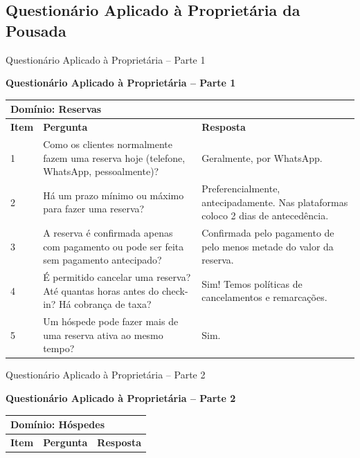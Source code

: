 \documentclass[
	12pt,				%
	openany,			%
	oneside,			%
	a4paper,			%
	english,			%
	french,				%
	spanish,			%
	brazil				%
	]{abntex2}
\begin{document}
\begin{apendicesenv}
\chapter{Questionário Aplicado à Proprietária da Pousada}
\label{apendice:questionario}
\begin{quadro}[H]
	\caption{Questionário Aplicado à Proprietária – Parte 1}
	\label{quadro:questionario1}
	\vspace{0.3cm} 
	\textbf\bfseries\large{Questionário Aplicado à Proprietária – Parte 1} \\
	\vspace{0.3cm} 
	\begin{tabular}{|p{1cm}|p{6.5cm}|p{6.5cm}|}
		\hline
		\multicolumn{3}{|l|}{\textbf{Domínio: Reservas}} \\ \hline
		\textbf{Item} & \textbf{Pergunta} & \textbf{Resposta} \\ \hline
		1 &  Como os clientes normalmente fazem uma reserva hoje (telefone, WhatsApp, pessoalmente)? & Geralmente, por WhatsApp. \\ \hline
		2 & Há um prazo mínimo ou máximo para fazer uma reserva? & Preferencialmente, antecipadamente. Nas plataformas coloco 2 dias de antecedência. \\ \hline
		3 & A reserva é confirmada apenas com pagamento ou pode ser feita sem pagamento antecipado? & Confirmada pelo pagamento de pelo menos metade do valor da reserva. \\ \hline
		4 & É permitido cancelar uma reserva? Até quantas horas antes do check-in? Há cobrança de taxa? & Sim! Temos políticas de cancelamentos e remarcações. \\ \hline
		5 & Um hóspede pode fazer mais de uma reserva ativa ao mesmo tempo? & Sim. \\ \hline
	\end{tabular}
\end{quadro}
\begin{quadro}[H]
	\caption{Questionário Aplicado à Proprietária – Parte 2}
	\label{quadro:questionario2}
	\vspace{0.3cm} 
	\textbf\bfseries\large{Questionário Aplicado à Proprietária – Parte 2} \\
	\vspace{0.3cm} 
	\begin{tabular}{|p{1cm}|p{6.5cm}|p{6.5cm}|}
		\hline
		\multicolumn{3}{|l|}{\textbf{Domínio: Hóspedes}} \\ \hline
		\textbf{Item} & \textbf{Pergunta} & \textbf{Resposta} \\ \hline

\end{tabular}
\end{quadro}
\end{apendicesenv}
\end{document}
